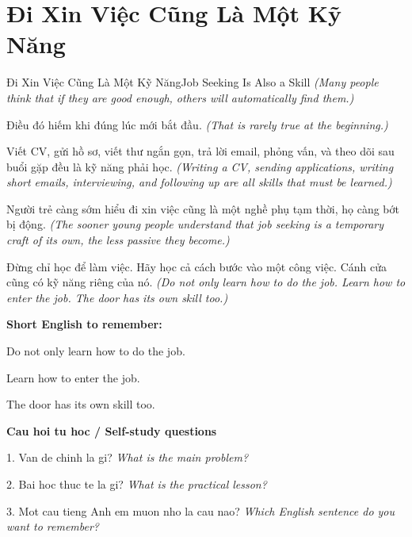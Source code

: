 \section{Đi Xin Việc Cũng Là Một Kỹ Năng}
\begin{truyen}{Đi Xin Việc Cũng Là Một Kỹ Năng}{Job Seeking Is Also a Skill}
\textit{(Many people think that if they are good enough, others will automatically find them.)}

Điều đó hiếm khi đúng lúc mới bắt đầu.
\textit{(That is rarely true at the beginning.)}

Viết CV, gửi hồ sơ, viết thư ngắn gọn, trả lời email, phỏng vấn, và theo dõi sau buổi gặp đều là kỹ năng phải học.
\textit{(Writing a CV, sending applications, writing short emails, interviewing, and following up are all skills that must be learned.)}

Người trẻ càng sớm hiểu đi xin việc cũng là một nghề phụ tạm thời, họ càng bớt bị động.
\textit{(The sooner young people understand that job seeking is a temporary craft of its own, the less passive they become.)}

\end{truyen}

\begin{baihoc}
Đừng chỉ học để làm việc. Hãy học cả cách bước vào một công việc. Cánh cửa cũng có kỹ năng riêng của nó.
\textit{(Do not only learn how to do the job. Learn how to enter the job. The door has its own skill too.)}
\end{baihoc}

\begin{ghinhoanh}
\textbf{Short English to remember:}

Do not only learn how to do the job.

Learn how to enter the job.

The door has its own skill too.

\end{ghinhoanh}

\begin{tuhocnhanh}
\textbf{Cau hoi tu hoc / Self-study questions}

1. Van de chinh la gi? \textit{What is the main problem?}

2. Bai hoc thuc te la gi? \textit{What is the practical lesson?}

3. Mot cau tieng Anh em muon nho la cau nao? \textit{Which English sentence do you want to remember?}
\end{tuhocnhanh}
\ngancach

